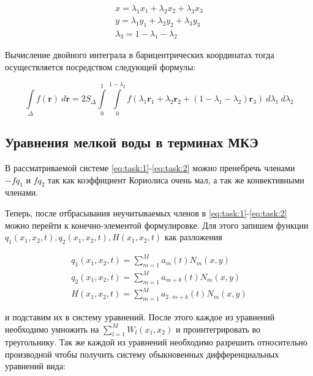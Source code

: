 \documentclass[14pt]{extreport}
\begin{document}
\begin{eqnarray}
x = \lambda_{1} x_{1} +  \lambda_{2} x_{2} +  \lambda_{3} x_{3} \\
y = \lambda_{1} y_{1} +  \lambda_{2} y_{2} +  \lambda_{3} y_{3} \\
\lambda_{3} = 1 - \lambda_{1} - \lambda_{2}
\end{eqnarray}


Вычисление двойного интеграла в барицентрических координатах тогда осуществляется посредством следующей формулы:


\begin{equation}
\int\limits_{\Delta} f(\mathbf{r}) \ d\mathbf{r} = 2S_{\Delta} \int\limits_{0}^{1} \int\limits_{0}^{1 - \lambda_{2}} f(\lambda_{1} \mathbf{r}_{1} + \lambda_{2} \mathbf{r}_{2} +
(1 - \lambda_{1} - \lambda_{2}) \mathbf{r}_{3}) \ d\lambda_{1} \ d\lambda_{2}
\end{equation}


\subsection{Уравнения мелкой воды в терминах МКЭ}

В рассматриваемой системе \ref{eq:task:1}-\ref{eq:task:2} можно пренебречь членами $-fq_{1}$ и $fq_2$ так как коэффициент Кориолиса очень мал, а так же конвективными членами.

Теперь, после отбрасывания неучитываемых членов в \ref{eq:task:1}-\ref{eq:task:2} можно перейти к конечно-элементой формулировке. Для этого запишем функции $q_1(x_1, x_2,t) , q_2(x_1, x_2,t), H(x_1, x_2,t)$ как разложения


\begin{eqnarray}\label{eq:fem:1}
q_1(x_1, x_2, t) = \sum\limits_{m=1}^{M} a_m(t)N_m(x, y) \\
q_2(x_1, x_2, t) = \sum\limits_{m=1}^{M} a_{m+k}(t)N_m(x, y) \\
H(x_1, x_2, t) = \sum\limits_{m=1}^{M} a_{2\cdot m+k}(t)N_m(x, y)
\end{eqnarray}


\noindent и подставим их в систему уравнений. После этого каждое из уравнений необходимо умножить на $\sum\limits_{l=1}^{M} W_l(x_1, x_2)$ и проинтегрировать во треугольнику. Так же каждой из уравнений необходимо разрешить относительно производной чтобы получить систему обыкновенных дифференциальных уравнений вида:
\end{document}
